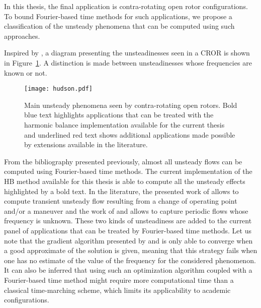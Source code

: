 
In this thesis, the final application is contra-rotating open rotor
configurations. To bound Fourier-based time methods for such
applications, we propose a classification of the
unsteady phenomena that can be computed using such approaches.

Inspired by \citet{Hodson1998},
a diagram presenting the unsteadinesses seen in 
a CROR is shown in Figure~\ref{fig:hudson}. A distinction
is made between unsteadinesses whose frequencies are
known or not.
\begin{figure}[htp]
  \centering
  \texttt{[image: hudson.pdf]}
  \caption{Main unsteady phenomena seen by contra-rotating
  open rotors. Bold blue text highlights applications that can
  be treated with the harmonic balance implementation available for the
  current thesis and underlined red text shows additional applications
  made possible by extensions available in the literature.}
  \label{fig:hudson}
\end{figure}
From the bibliography presented previously, almost all
unsteady flows can be computed using Fourier-based time methods.
The current implementation of the HB method available for
this thesis is able to compute all the unsteady effects highlighted
by a bold text. In the literature, the presented work of 
\citet{Mavriplis2012} allows to compute transient unsteady flow
resulting from a change of operating point and/or a maneuver and
the work of \citet{McMullen2002} and \citet{Gopinath2006} allows
to capture periodic flows whose frequency is unknown. These two
kinds of unsteadiness are added
to the current panel of applications that can
be treated by Fourier-based time methods. Let us note
that the gradient algorithm presented by \citet{McMullen2002}
and \citet{Gopinath2006} is only able to converge when a 
good approximate of the solution is given, meaning
that this strategy fails when one has no estimate
of the value of the frequency for the considered phenomenon.
It can also be inferred that using such an optimization algorithm
coupled with a Fourier-based time method
might require more computational time than a classical time-marching scheme,
which limits its applicability to academic configurations.

